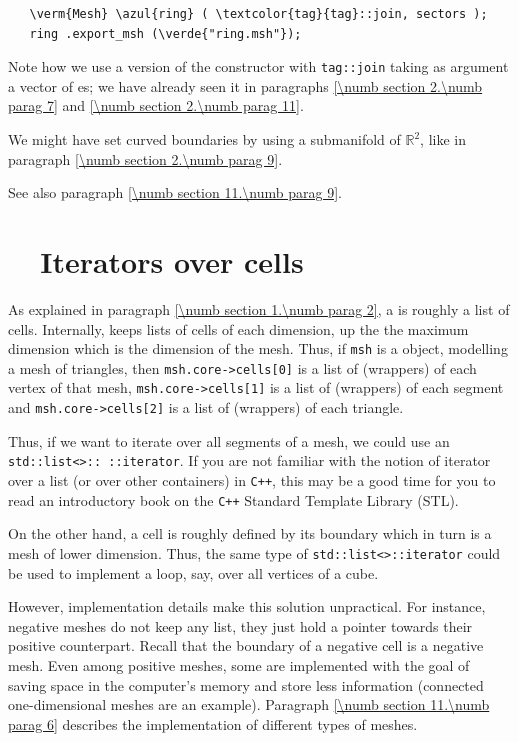 \begin{Verbatim}
   \verm{Mesh} \azul{ring} ( \textcolor{tag}{tag}::join, sectors );
   ring .export_msh (\verde{"ring.msh"});
\end{Verbatim}

Note how we use a version of the {\small\tt {}} constructor with {\small\tt \textcolor{tag}{tag}::join}
taking as argument a vector of {\small\tt {}}es; we have already seen it in paragraphs
\ref{\numb section 2.\numb parag 7} and \ref{\numb section 2.\numb parag 11}.

We might have set curved boundaries by using a submanifold of $ \mathbb{R}^2 $, like in paragraph
\ref{\numb section 2.\numb parag 9}.

See also paragraph \ref{\numb section 11.\numb parag 9}.


\section{~~Iterators over cells}\label{\numb section 9.\numb parag 3}

As explained in paragraph \ref{\numb section 1.\numb parag 2}, a {\small\tt {}} is
roughly a list of cells.
Internally, {\maniFEM} keeps lists of cells of each dimension, up the the maximum
dimension which is the dimension of the mesh.
Thus, if {\small\tt msh} is a {\small\tt {}} object, modelling a
mesh of triangles, then {\small\tt msh.core->cells[0]} is a list of (wrappers) of
each vertex of that mesh, {\small\tt msh.core->cells[1]} is a list of (wrappers) of
each segment and {\small\tt msh.core->cells[2]} is a list of (wrappers) of each triangle.

Thus, if we want to iterate over all segments of a mesh, we could use an
{\small\tt std::list<>:: ::iterator}.
If you are not familiar with the notion of iterator over a list (or over other containers)
in {\tt C++}, this may be a good time for you to read an introductory book on the
{\tt C++} Standard Template Library (STL).

On the other hand, a cell is roughly defined by its boundary which in turn is a mesh of
lower dimension.
Thus, the same type of {\small\tt std::list<>::iterator} could be used to
implement a loop, say, over all vertices of a cube.

However, implementation details make this solution unpractical.
For instance, negative meshes do not keep any list,
they just hold a pointer towards their positive counterpart.
Recall that the boundary of a negative cell is a negative mesh.
Even among positive meshes, some are implemented with the goal of saving space in the
computer's memory and store less information (connected one-dimensional meshes are an
example).
Paragraph \ref{\numb section 11.\numb parag 6} describes the implementation of different
types of meshes.

